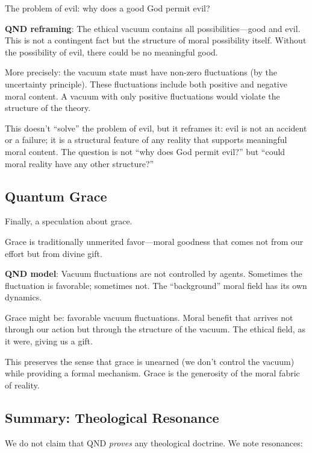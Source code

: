 \documentclass[12pt]{article}
\begin{document}
The problem of evil: why does a good God permit evil?

\textbf{QND reframing}: The ethical vacuum contains all possibilities---good and evil. This is not a contingent fact but the structure of moral possibility itself. Without the possibility of evil, there could be no meaningful good.

More precisely: the vacuum state must have non-zero fluctuations (by the uncertainty principle). These fluctuations include both positive and negative moral content. A vacuum with only positive fluctuations would violate the structure of the theory.

This doesn't ``solve'' the problem of evil, but it reframes it: evil is not an accident or a failure; it is a structural feature of any reality that supports meaningful moral content. The question is not ``why does God permit evil?'' but ``could moral reality have any other structure?''

\subsection{Quantum Grace}

Finally, a speculation about grace.

Grace is traditionally unmerited favor---moral goodness that comes not from our effort but from divine gift.

\textbf{QND model}: Vacuum fluctuations are not controlled by agents. Sometimes the fluctuation is favorable; sometimes not. The ``background'' moral field has its own dynamics.

Grace might be: favorable vacuum fluctuations. Moral benefit that arrives not through our action but through the structure of the vacuum. The ethical field, as it were, giving us a gift.

This preserves the sense that grace is unearned (we don't control the vacuum) while providing a formal mechanism. Grace is the generosity of the moral fabric of reality.

\subsection{Summary: Theological Resonance}

We do not claim that QND \emph{proves} any theological doctrine. We note resonances:
\end{document}

